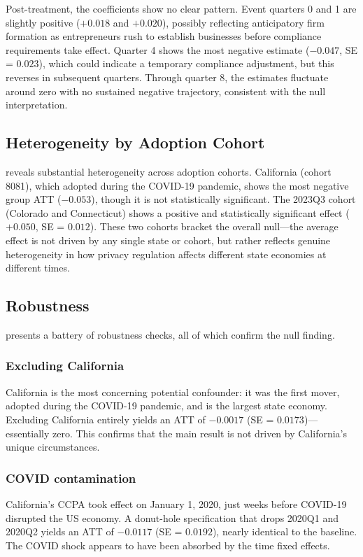\documentclass[12pt]{article}
\begin{document}
Post-treatment, the coefficients show no clear pattern. Event quarters 0 and 1 are slightly positive ($+0.018$ and $+0.020$), possibly reflecting anticipatory firm formation as entrepreneurs rush to establish businesses before compliance requirements take effect. Quarter 4 shows the most negative estimate ($-0.047$, SE = $0.023$), which could indicate a temporary compliance adjustment, but this reverses in subsequent quarters. Through quarter 8, the estimates fluctuate around zero with no sustained negative trajectory, consistent with the null interpretation.



\subsection{Heterogeneity by Adoption Cohort}

 reveals substantial heterogeneity across adoption cohorts. California (cohort 8081), which adopted during the COVID-19 pandemic, shows the most negative group ATT ($-0.053$), though it is not statistically significant. The 2023Q3 cohort (Colorado and Connecticut) shows a positive and statistically significant effect ($+0.050$, SE = $0.012$). These two cohorts bracket the overall null---the average effect is not driven by any single state or cohort, but rather reflects genuine heterogeneity in how privacy regulation affects different state economies at different times.



\subsection{Robustness}

 presents a battery of robustness checks, all of which confirm the null finding.

\subsubsection*{Excluding California} California is the most concerning potential confounder: it was the first mover, adopted during the COVID-19 pandemic, and is the largest state economy. Excluding California entirely yields an ATT of $-0.0017$ (SE = $0.0173$)---essentially zero. This confirms that the main result is not driven by California's unique circumstances.

\subsubsection*{COVID contamination} California's CCPA took effect on January 1, 2020, just weeks before COVID-19 disrupted the US economy. A donut-hole specification that drops 2020Q1 and 2020Q2 yields an ATT of $-0.0117$ (SE = $0.0192$), nearly identical to the baseline. The COVID shock appears to have been absorbed by the time fixed effects.
\end{document}
